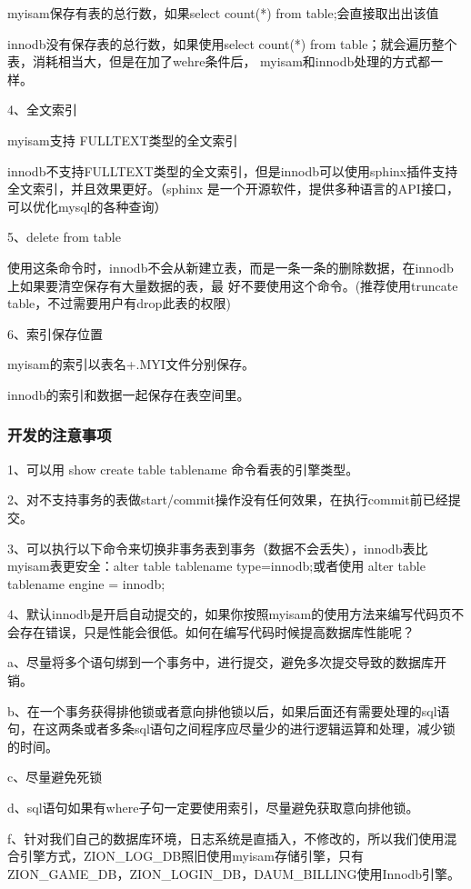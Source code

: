 \documentclass[UTF8]{ctexart}
\begin{document}
myisam保存有表的总行数，如果select count(*) from table;会直接取出出该值

innodb没有保存表的总行数，如果使用select count(*) from table；就会遍历整个表，消耗相当大，但是在加了wehre条件后，
myisam和innodb处理的方式都一样。

4、全文索引

myisam支持 FULLTEXT类型的全文索引

innodb不支持FULLTEXT类型的全文索引，但是innodb可以使用sphinx插件支持全文索引，并且效果更好。（sphinx   是一个开源软件，提供多种语言的API接口，可以优化mysql的各种查询）

5、delete from table

使用这条命令时，innodb不会从新建立表，而是一条一条的删除数据，在innodb上如果要清空保存有大量数据的表，最       好不要使用这个命令。(推荐使用truncate table，不过需要用户有drop此表的权限)

6、索引保存位置

myisam的索引以表名+.MYI文件分别保存。

innodb的索引和数据一起保存在表空间里。

\subsubsection{开发的注意事项}

1、可以用 show create table tablename 命令看表的引擎类型。

2、对不支持事务的表做start/commit操作没有任何效果，在执行commit前已经提交。

3、可以执行以下命令来切换非事务表到事务（数据不会丢失），innodb表比myisam表更安全：alter table tablename type=innodb;或者使用 alter table tablename engine = innodb;

4、默认innodb是开启自动提交的，如果你按照myisam的使用方法来编写代码页不会存在错误，只是性能会很低。如何在编写代码时候提高数据库性能呢？

a、尽量将多个语句绑到一个事务中，进行提交，避免多次提交导致的数据库开销。

b、在一个事务获得排他锁或者意向排他锁以后，如果后面还有需要处理的sql语句，在这两条或者多条sql语句之间程序应尽量少的进行逻辑运算和处理，减少锁的时间。

c、尽量避免死锁

d、sql语句如果有where子句一定要使用索引，尽量避免获取意向排他锁。

f、针对我们自己的数据库环境，日志系统是直插入，不修改的，所以我们使用混合引擎方式，ZION\_LOG\_DB照旧使用myisam存储引擎，只有ZION\_GAME\_DB，ZION\_LOGIN\_DB，DAUM\_BILLING使用Innodb引擎。
\end{document}
